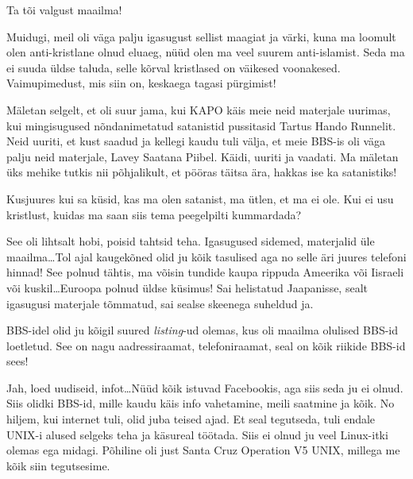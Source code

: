 
Ta tõi valgust maailma! 

Muidugi, meil oli väga palju igasugust sellist maagiat ja värki, kuna ma 
loomult olen anti-kristlane olnud eluaeg, nüüd olen ma veel suurem 
anti-islamist. Seda ma ei suuda üldse taluda,  selle kõrval kristlased on 
väikesed voonakesed. Vaimupimedust, mis siin on, keskaega tagasi pürgimist! 

Mäletan selgelt, et oli suur jama, kui KAPO käis meie neid materjale uurimas, 
kui mingisugused nõndanimetatud satanistid pussitasid Tartus Hando 
Runnelit. Neid uuriti, et kust saadud ja kellegi 
kaudu tuli  välja, et meie BBS-is oli väga palju neid materjale, Lavey Saatana 
Piibel. Käidi, uuriti ja vaadati. Ma mäletan üks mehike tutkis nii põhjalikult, 
et pööras täitsa ära, hakkas ise ka satanistiks!

Kusjuures kui sa küsid, kas ma olen satanist, ma ütlen, et ma ei ole. Kui ei 
usu kristlust, kuidas ma saan siis tema peegelpilti kummardada?


See oli lihtsalt hobi, poisid tahtsid teha. Igasugused sidemed, materjalid üle 
maailma\ldots Tol ajal kaugekõned olid ju kõik tasulised aga no selle äri 
juures telefoni hinnad! See polnud tähtis, ma võisin tundide kaupa rippuda 
Ameerika või Iisraeli või kuskil\ldots Euroopa polnud üldse küsimus! Sai 
helistatud Jaapanisse, sealt igasugusi materjale tõmmatud, sai sealse skeenega 
suheldud ja.


BBS-idel olid ju kõigil suured \emph{listing}-ud olemas, kus oli maailma 
olulised BBS-id loetletud. See on nagu aadressiraamat,  telefoniraamat, seal on 
kõik riikide BBS-id sees! 


Jah, loed uudiseid, infot\ldots Nüüd  kõik istuvad Facebookis, aga siis seda ju 
ei olnud. Siis olidki BBS-id, mille kaudu käis info vahetamine, meili saatmine 
ja kõik. No hiljem, kui internet tuli, olid juba teised ajad. Et seal 
tegutseda, tuli endale UNIX-i alused selgeks teha ja käsureal töötada. Siis ei 
olnud ju veel Linux-itki olemas ega midagi. Põhiline oli just Santa Cruz 
Operation V5 UNIX, millega 
me kõik siin tegutsesime.

